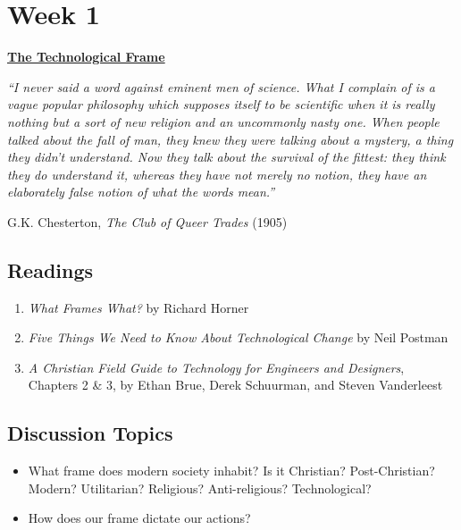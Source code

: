 \documentclass[11pt]{article}
\let\oldsection\section
\renewcommand\section{\clearpage\oldsection}
\begin{document}
\section*{Week 1}
\label{sec:org2a925a9}
\begin{center}
\large \textbf{\uline{The Technological Frame}}
\end{center}
\begin{mdframed}
\emph{``I never said a word against eminent men of science. What I complain of is a
vague popular philosophy which supposes itself to be scientific when it is
really nothing but a sort of new religion and an uncommonly nasty one. When
people talked about the fall of man, they knew they were talking about a
mystery, a thing they didn’t understand. Now they talk about the survival of the
fittest: they think they do understand it, whereas they have not merely no
notion, they have an elaborately false notion of what the words mean.''}

\hfill G.K. Chesterton, \emph{The Club of Queer Trades} (1905)
\end{mdframed}
\subsection*{Readings}
\label{sec:org69b3281}
\begin{enumerate}
\item \emph{What Frames What?} by Richard Horner
\item \emph{Five Things We Need to Know About Technological Change} by Neil Postman
\item \emph{A Christian Field Guide to Technology for Engineers and Designers}, Chapters
2 \& 3, by Ethan Brue, Derek Schuurman, and Steven Vanderleest
\end{enumerate}
\subsection*{Discussion Topics}
\label{sec:org7409530}
\begin{itemize}
\item What frame does modern society inhabit? Is it Christian? Post-Christian?
Modern? Utilitarian? Religious? Anti-religious? Technological?
\item How does our frame dictate our actions?
\end{itemize}
\end{document}
